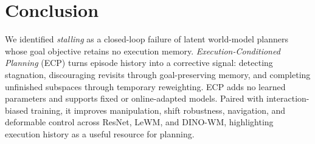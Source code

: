 \section{Conclusion}
We identified \emph{stalling} as a closed-loop failure of latent world-model planners whose goal objective retains no execution memory. \emph{Execution-Conditioned Planning} (ECP) turns episode history into a corrective signal: detecting stagnation, discouraging revisits through goal-preserving memory, and completing unfinished subspaces through temporary reweighting. ECP adds no learned parameters and supports fixed or online-adapted models. Paired with interaction-biased training, it improves manipulation, shift robustness, navigation, and deformable control across ResNet, LeWM, and DINO-WM, highlighting execution history as a useful resource for planning.
